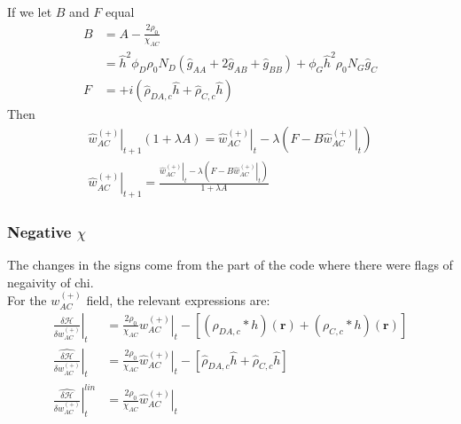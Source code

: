 \documentclass{article}
\begin{document}
  If we let $B$ and $F$ equal
  \begin{align*}
    B &= A - \frac{2\rho_0}{\chi_{AC}} \\
      &= \hat{h}^2 \phi_D \rho_0 N_D
          (\hat{g}_{AA} + 2 \hat{g}_{AB} + \hat{g}_{BB}) 
          + \phi_G   \hat{h}^2  \rho_0 N_G 
          \hat{g}_{C}\\
    F &= + i ( \hat{\rho}_{DA,c} \hat{h}
              + \hat{\rho}_{C,c} \hat{h} )
  \end{align*}
  Then
  \begin{align*}
    \left. \hat{w}_{AC}^{(+)} \right|_{t+1} ( 1 + \lambda A ) =
      \left. \hat{w}_{AC}^{(+)} \right|_t
      - \lambda \left( F - B \left. \hat{w}_{AC}^{(+)} \right|_t \right) \\
    \left. \hat{w}_{AC}^{(+)} \right|_{t+1} =
    \frac{\left. \hat{w}_{AC}^{(+)} \right|_t - \lambda
            \left( F - B \left. \hat{w}_{AC}^{(+)} \right|_t \right)}
         {1 + \lambda A}
  \end{align*}
  
    \subsubsection{Negative $\chi$}
    The changes in the signs come from the part of the code where there were flags of negaivity of chi. \\
    For the $w_{AC}^{(+)}$ field, the relevant expressions are:
  \begin{align*}
    \left. \frac{\delta \mathcal{H}}{\delta  w_{AC}^{(+)} } \right|_t &=
      \frac{2\rho_0}{\chi_{AC}} \left. w_{AC}^{(+)} \right|_t
      -   [ (\rho_{DA,c} \ast h)(\mathbf{r})
            + (\rho_{C,c} \ast h)(\mathbf{r}) ] \\
      \left. \hat{\frac{\delta \mathcal{H}}{\delta w_{AC}^{(+)}}} \right|_t &=
      \frac{2\rho_0}{\chi_{AC}} \left. \hat{w}_{AC}^{(+)} \right|_t
      -   [ \hat{\rho}_{DA,c} \hat{h}
            + \hat{\rho}_{C,c} \hat{h} ] 
            \\
            \left.
            \hat{\frac{\delta \mathcal{H}}{\delta w_{AC}^{(+)}}}
            \right| ^{lin}_t &=
            \frac{2\rho_0}{\chi_{AC}} \left. \hat{w}_{AC}^{(+)} \right|_t
  \end{align*}
  
\end{document}
